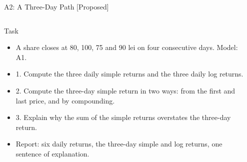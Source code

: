 \begin{frame}{A2: A Three-Day Path [Proposed]}
\propsub
\itemsize{\footnotesize}
\begin{columns}[T]
\begin{column}{\taskw}
\begin{block}{Task}
\begin{itemize}
    \item A share closes at 80, 100, 75 and 90 lei on four consecutive days. Model: A1.
    \item 1. Compute the three daily simple returns and the three daily log returns.
    \item 2. Compute the three-day simple return in two ways: from the first and last price, and by compounding.
    \item 3. Explain why the sum of the simple returns overstates the three-day return.
    \item Report: six daily returns, the three-day simple and log returns, one sentence of explanation.
\end{itemize}
\end{block}
\end{column}
\begin{column}{\solw}
\end{column}
\end{columns}
\end{frame}

